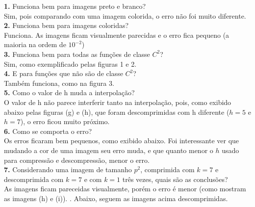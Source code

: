 \documentclass[12pt,letterpaper]{article}
\begin{document}
	\textbf{1.} Funciona bem para imagens preto e branco?\\
	Sim, pois comparando com uma imagem colorida, o erro não foi muito diferente.\\
	
	\textbf{2.} Funciona bem para imagens coloridas?\\
	Funciona. As imagens ficam visualmente parecidas e o erro fica pequeno (a maioria na ordem de $10^{-2}$)\\
	
	\textbf{3.} Funciona bem para todas as funções de classe $C^2$?\\
	Sim, como exemplificado pelas figuras 1 e 2.\\
	
	\textbf{4.} E para funções que não são de classe $C^2$? \\
	Também funciona, como na figura 3.\\
	
	\textbf{5.} Como o valor de h muda a interpolação? \\
	O valor de h não parece interferir tanto na interpolação, pois, como exibido abaixo pelas figuras (g) e (h), que foram descomprimidas com h diferente ($h = 5$ e $h = 7$), o erro ficou muito próximo.\\
	
	\textbf{6.} Como se comporta o erro?\\
	Os erros ficaram bem pequenos, como exibido abaixo. Foi interessante ver que mudando a cor de uma imagem seu erro muda, e que quanto menor o $h$ usado para compressão e descompressão, menor o erro. \\
	
	\textbf{7.} Considerando uma imagem de tamanho $p^2$, comprimida com $k = 7$ e descomprimida com $k = 7$ e com $k = 1$ três vezes, quais são as conclusões?\\
	As imagens ficam pareceidas visualmente, porém o erro é menor (como mostram as imagens (h) e (i)).
.
	Abaixo, seguem as imagens acima descomprimidas.
	
\end{document}
